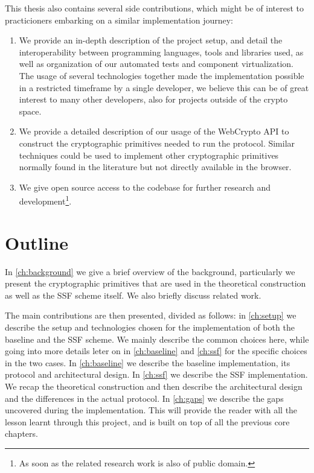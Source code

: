 This thesis also contains several side contributions, which might be of interest to
practicioners embarking on a similar implementation journey:
\begin{enumerate}
    \item We provide an in-depth description of the project setup, and detail the interoperability between programming languages, tools and libraries used, as well as organization of our automated tests and component virtualization. The usage of several technologies together made the implementation possible in a restricted timeframe by a single developer, we believe this can be of great interest to many other developers, also for projects outside of the crypto space. 
    \item We provide a detailed description of our usage of the WebCrypto API to construct the cryptographic primitives needed to run the protocol. Similar techniques could be used to implement other cryptographic primitives normally found in the literature but not directly available in the browser. 
    \item We give open source access to the codebase for further research and development\footnote{As soon as the related research work is also of public domain.}.
\end{enumerate}

\section{Outline}

In \cref{ch:background} we give a brief overview of the background, particularly 
we present the cryptographic primitives that are used in the theoretical construction 
as well as the SSF scheme itself. We also briefly discuss related work. 

The main contributions are then presented, divided as follows: 
in \cref{ch:setup} we describe the setup and technologies chosen for the implementation of both the baseline and the SSF scheme. We mainly describe the common choices here, while going into more details leter on in \cref{ch:baseline} and \cref{ch:ssf} for the specific choices in the two cases.
In \cref{ch:baseline} we describe the baseline implementation, its protocol and architectural design.
In \cref{ch:ssf} we describe the SSF implementation. We recap the theoretical construction and then describe the architectural design and the differences in the actual protocol.
In \cref{ch:gaps} we describe the gaps uncovered during the implementation. This will provide the reader with all the lesson learnt through this project, and is built on top of all the previous core chapters.

